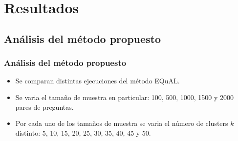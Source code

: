 \section{Resultados}

\subsection{Análisis del método propuesto}
\begin{frame}
	\frametitle{Análisis del método propuesto}

	\begin{itemize}
		\item Se comparan distintas ejecuciones del método EQuAL.
		\item Se varia el tamaño de muestra en particular: 100, 500, 1000, 1500 y 2000 pares de preguntas.
		\item Por cada uno de los tamaños de muestra se varia el número de clusters \(k\) distinto: 5, 10, 15, 20, 25, 30, 35, 40, 45 y 50.
	\end{itemize}

	\framebreak


\end{frame}
